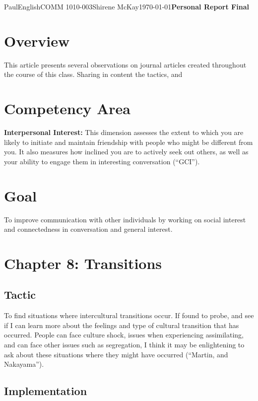\documentclass[12pt,letterpaper]{article}
\begin{document}
\begin{mla}{Paul}{English}{COMM 1010-003}{Shirene
    McKay}{\today}{\textbf{Personal Report Final}}

\section{Overview}

This article presents several observations on journal articles created throughout the course of this class. Sharing in content the tactics, and 

\section{Competency Area}

\textbf{Interpersonal Interest:} This dimension assesses the extent to which
you are likely to initiate and maintain friendship with people who
might be different from you. It also measures how inclined you are to
actively seek out others, as well as your ability to engage them in
interesting conversation (``GCI'').

\section{Goal}

To improve communication with other individuals by working on social interest and connectedness in conversation and general interest.

\section{Chapter 8: Transitions}

\subsection{Tactic}

To find situations where intercultural transitions occur. If found to probe, and see if I can learn more about the feelings and type of cultural transition that has occurred. People can face culture shock, issues when experiencing assimilating, and can face other issues such as segregation, I think it may be enlightening to ask about these situations where they might have occurred (``Martin, and Nakayama''). 

\subsection{Implementation}


\end{mla}
\end{document}
